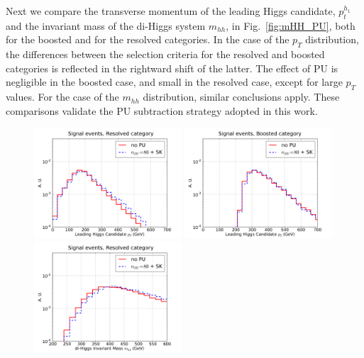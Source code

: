 Next we compare the transverse momentum of the leading Higgs
candidate, $p_t^{h_1}$ and the invariant mass of the di-Higgs system
$m_{hh}$, in Fig.~\ref{fig:mHH_PU}, both for the boosted and
for the resolved categories.
%
In the case of the $p_T$ distribution, the differences between the selection
criteria for the resolved
and boosted categories is reflected in the rightward shift of the latter.
%
The effect of PU is negligible in the boosted case, and small
in the resolved case, except for large $p_T$ values.
%
For the case of the $m_{hh}$ distribution, similar conclusions
apply.
%
These comparisons validate the PU subtraction strategy
adopted in this work.


\begin{figure}[t]
  \begin{center}
    \vspace{-1cm}
  \includegraphics[width=0.49\textwidth]{plots/pt_H0_C2_res_comp.pdf}
  \includegraphics[width=0.49\textwidth]{plots/pt_H0_C2_bst_comp.pdf}
  \includegraphics[width=0.49\textwidth]{plots/m_HH_C2_res_comp.pdf}

\end{center}
\end{figure}
